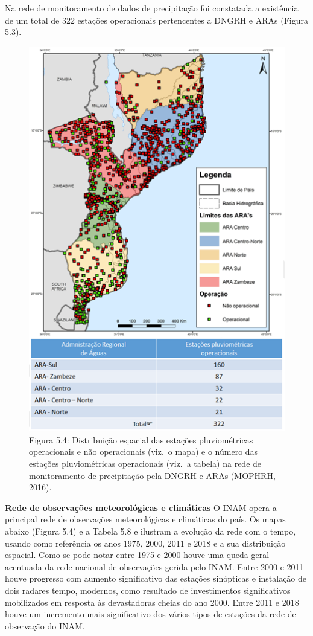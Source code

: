 \documentclass[
]{book}
\begin{document}
Na rede de monitoramento de dados de precipitação foi constatada a existência de um total de 322 estações operacionais pertencentes a DNGRH e ARAs (Figura 5.3).

\begin{figure}
\centering
\includegraphics{images/pluviometricas_operacionais.png}
\caption{Figura 5.4: Distribuição espacial das estações pluviométricas operacionais e não operacionais (viz.~o mapa) e o número das estações pluviométricas operacionais (viz.~a tabela) na rede de monitoramento de precipitação pela DNGRH e ARAs (MOPHRH, 2016).}
\end{figure}

\textbf{Rede de observações meteorológicas e climáticas}
O INAM opera a principal rede de observações meteorológicas e climáticas do país. Os mapas abaixo (Figura 5.4) e a Tabela 5.8 e ilustram a evolução da rede com o tempo, usando como referência os anos 1975, 2000, 2011 e 2018 e a sua distribuição espacial. Como se pode notar entre 1975 e 2000 houve uma queda geral acentuada da rede nacional de observações gerida pelo INAM. Entre 2000 e 2011 houve progresso com aumento significativo das estações sinópticas e instalação de dois radares tempo, modernos, como resultado de investimentos significativos mobilizados em resposta às devastadoras cheias do ano 2000. Entre 2011 e 2018 houve um incremento mais significativo dos vários tipos de estações da rede de observação do INAM.
\end{document}
